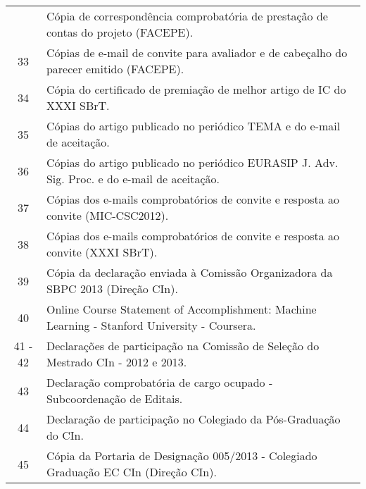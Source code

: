 \documentclass[a4paper,oneside,10pt]{article}
\begin{document}
\begin{table}[h]
\begin{tabular}{cl}
     & C\'{o}pia de correspond\^{e}ncia comprobat\'{o}ria de presta\c{c}\~{a}o de contas do projeto (FACEPE). \\
  \cmidrule{1-2}
  33 & C\'{o}pias de e-mail de convite para avaliador e de cabe\c{c}alho do parecer emitido (FACEPE). \\
  34 & C\'{o}pia do certificado de premia\c{c}\~{a}o de melhor artigo de IC do XXXI SBrT. \\
  35 & C\'{o}pias do artigo publicado no peri\'{o}dico TEMA e do e-mail de aceita\c{c}\~{a}o. \\
  36 & C\'{o}pias do artigo publicado no peri\'{o}dico EURASIP J. Adv. Sig. Proc. e do e-mail de aceita\c{c}\~{a}o. \\
  37 & C\'{o}pias dos e-mails comprobat\'{o}rios de convite e resposta ao convite (MIC-CSC2012). \\
  38 & C\'{o}pias dos e-mails comprobat\'{o}rios de convite e resposta ao convite (XXXI SBrT). \\
  39 & C\'{o}pia da declara\c{c}\~{a}o enviada \`{a} Comiss\~{a}o Organizadora da SBPC 2013 (Dire\c{c}\~{a}o CIn). \\
  40 & Online Course Statement of Accomplishment: Machine Learning - Stanford University - Coursera. \\
  41 - 42 & Declara\c{c}\~{o}es de participa\c{c}\~{a}o na Comiss\~{a}o de Sele\c{c}\~{a}o do Mestrado CIn - 2012 e 2013. \\
  43 & Declara\c{c}\~{a}o comprobat\'{o}ria de cargo ocupado - Subcoordena\c{c}\~{a}o de Editais. \\
  44 & Declara\c{c}\~{a}o de participa\c{c}\~{a}o no Colegiado da P\'{o}s-Gradua\c{c}\~{a}o do CIn. \\
  45 & C\'{o}pia da Portaria de Designa\c{c}\~{a}o 005/2013 - Colegiado Gradua\c{c}\~{a}o EC CIn (Dire\c{c}\~{a}o CIn). \\
\bottomrule
\end{tabular}
\label{Tab:ListaAnexos}
\end{table}

\clearpage
\appendix
\newpage
\end{document}
